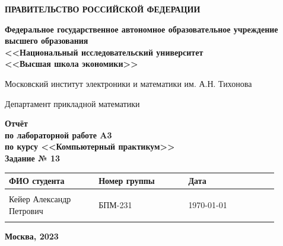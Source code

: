 \documentclass[12pt]{article}
\begin{document}
	
	\thispagestyle{empty}
	\begin{center}
		\textbf{ПРАВИТЕЛЬСТВО РОССИЙСКОЙ ФЕДЕРАЦИИ}
		
		\vspace{5ex}
		
		\textbf{Федеральное государственное автономное образовательное учреждение \\ высшего образования \\ <<Национальный исследовательский университет \\ <<Высшая школа экономики>>}
	\end{center}
	\vspace{5ex}
	
	\begin{center}
		Московский институт электроники и математики им. А.Н. Тихонова  
		
		\vspace{5ex}
		
		Департамент прикладной математики
		
		\vspace{10ex}
		\textbf{Отчёт \\ по лабораторной работе A3 \\ по курсу <<Компьютерный практикум>> \\ Задание № 13}
		\vspace{7ex}
		
	\end{center}
	
	\begin{center} 
		\begin{tabular}{| p{0.3\linewidth}| p{0.3\linewidth}| p{0.3\linewidth}|}
			\hline	
			ФИО студента & Номер группы & Дата \\  \hline
			& & \\  
			Кейер Александр \newline Петрович & БПМ-231 & \today \\  
			& & \\  \hline		
		\end{tabular}
	\end{center}
	
	\begin{center}
		\vspace{3ex}
		
		\vfill
		
		\normalsize
		
		\textbf{Москва, 2023}
	\end{center}
	
	\newpage
	
\end{document}
